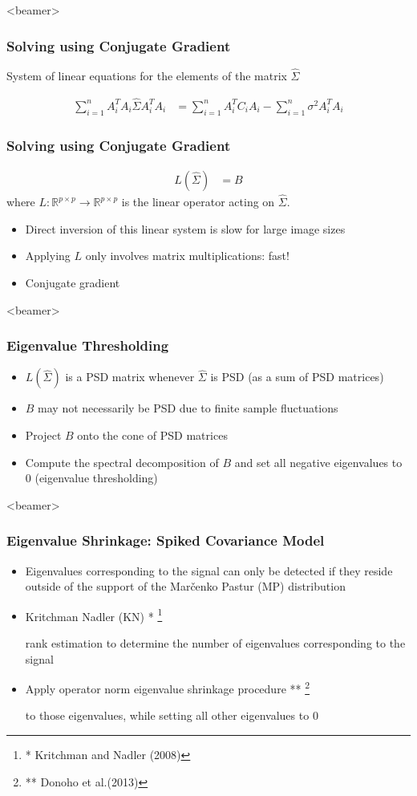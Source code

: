 \documentclass{beamer}
\newcommand\blfootnote[1]{%
  \begingroup
  \renewcommand\thefootnote{}\footnote{#1}%
  \addtocounter{footnote}{-1}%
  \endgroup
}
\begin{document}
\begin{frame}<beamer>
\frametitle{Solving using Conjugate Gradient}
System of linear equations for the elements of the matrix $\hat \Sigma$

\begin{equation*}
\begin{aligned}
\sum_{i=1}^n  A_i^T  A_i \hat \Sigma A_i^T A_i
&= \sum_{i=1}^n A_i^T C_i A_i - \sum_{i=1}^n \sigma^2 A_i^T A_i 
\end{aligned}
\label{eqn:normal_white}
\end{equation*}
\frametitle{Solving using Conjugate Gradient}
\begin{equation*}
\begin{aligned}
L(\hat\Sigma) 
&=  B 
\label{eqn:cg}
\end{aligned}
\end{equation*}
where $L:\mathbb{R}^{p\times p} \to \mathbb{R}^{p\times p}$ is the linear operator acting on $\hat{\Sigma}$.

\begin{itemize}
 \item Direct inversion of this linear system is slow for large image sizes
 \item Applying $L$ only involves matrix multiplications: fast!
 \item Conjugate gradient 
\end{itemize}

\end{frame}


\begin{frame}<beamer>
\frametitle{Eigenvalue Thresholding}
\begin{itemize}[]
 \item  $L(\hat{\Sigma})$ is a PSD matrix whenever $\hat{\Sigma}$ is PSD (as 
a sum of PSD matrices)
\item  $B$ may not necessarily be PSD due to finite 
sample fluctuations 
\item  Project $B$ onto the cone of PSD matrices
\item  Compute the spectral 
decomposition of $B$ and set all negative eigenvalues to 0  (eigenvalue thresholding)
\end{itemize}
\end{frame}


\begin{frame}<beamer>
\frametitle{Eigenvalue Shrinkage: Spiked Covariance Model}
\begin{itemize}[]
\item Eigenvalues corresponding to the signal 
can only be detected if they reside outside of the support of the  Mar\v{c}enko Pastur (MP)
distribution
\item Kritchman Nadler (KN) *\blfootnote{{* Kritchman and Nadler
(2008)}} rank estimation to determine the number of eigenvalues 
corresponding to the signal 
\item Apply operator norm eigenvalue 
shrinkage procedure **\blfootnote{** Donoho et al.(2013)} to those eigenvalues, while setting all other eigenvalues to 
$0$ 
\end{itemize}
\end{frame}
\end{document}
